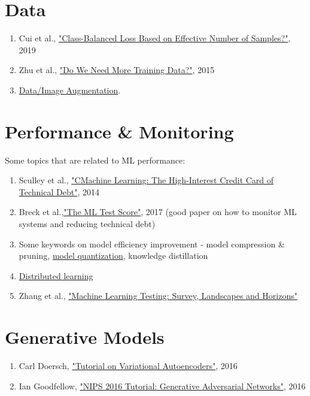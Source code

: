 \documentclass[12pt,letterpaper]{article}
\begin{document}
\section*{Data}
\begin{enumerate}
    \item Cui et al., \href{https://arxiv.org/abs/1901.05555}{"Class-Balanced Loss Based on Effective Number of Samples?"}, 2019
    \item Zhu et al., 
    \href{https://arxiv.org/abs/1503.01508}{"Do We Need More Training Data?"}, 2015
    \item \href{https://d2l.ai/chapter_computer-vision/image-augmentation.html}{Data/Image Augmentation}.
\end{enumerate}
\section*{Performance \& Monitoring}
Some topics that are related to ML performance:
\begin{enumerate}
    \item Sculley et al., 
    \href{https://storage.googleapis.com/pub-tools-public-publication-data/pdf/43146.pdf}{"CMachine Learning:
The High-Interest Credit Card of Technical Debt"}, 2014
    \item Breck et al.,\href{https://storage.googleapis.com/pub-tools-public-publication-data/pdf/aad9f93b86b7addfea4c419b9100c6cdd26cacea.pdf}{"The ML Test Score"}, 2017 (good paper on how to monitor ML systems and reducing technical debt)
    \item Some keywords on model efficiency improvement - model compression & pruning, \href{https://blogs.nvidia.com/blog/2020/05/14/tensorfloat-32-precision-format/}{model quantization}, knowledge distillation
    \item \href{https://pytorch.org/tutorials/beginner/dist_overview.html}{Distributed learning}
    \item Zhang et al., \href{https://arxiv.org/abs/1906.10742}{"Machine Learning Testing: Survey, Landscapes and Horizons"}
\end{enumerate}

\section*{Generative Models}
\begin{enumerate}
    \item Carl Doersch, \href{https://arxiv.org/abs/1606.05908}{"Tutorial on Variational Autoencoders"}, 2016
    \item Ian Goodfellow, \href{https://arxiv.org/abs/1701.00160}{"NIPS 2016 Tutorial: Generative Adversarial Networks"}, 2016
\end{enumerate}
\end{document}
